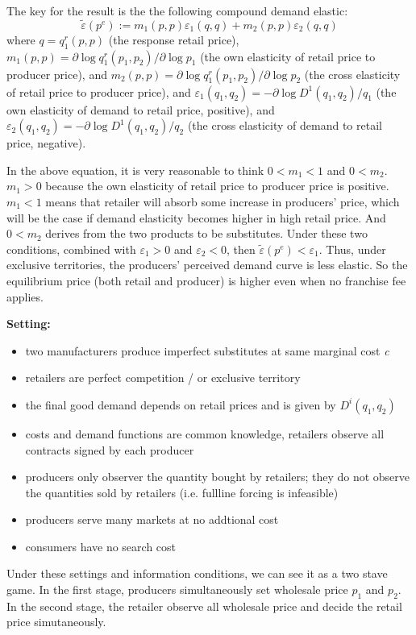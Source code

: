 \documentclass{book}
\theoremstyle{plain}
\theoremstyle{definition}
\begin{document}
The key for the result is the the following compound demand elastic:
\[\tilde\varepsilon(p^e):=m_1(p,p)\varepsilon_1(q,q)+m_2(p,p)\varepsilon_2(q,q) \]
where $q=q_1^r(p,p)$ (the response retail price),
$m_1(p,p)=\partial \log q_1^r(p_1,p_2)/\partial \log p_1$ (the own elasticity of retail price to producer price),
and  $m_2(p,p)=\partial \log q_1^r(p_1,p_2)/\partial \log p_2$ (the cross elasticity of retail price to producer price),
and $\varepsilon_1(q_1,q_2)=-\partial \log D^1(q_1,q_2)/q_1$ (the own elasticity of demand to retail price, positive),
and $\varepsilon_2(q_1,q_2)=-\partial \log D^1(q_1,q_2)/q_2$ (the cross elasticity of demand to retail price, negative).

In the above equation, it is very reasonable to think $0<m_1<1$ and $0<m_2$. $m_1>0$ because the own elasticity of retail price to producer price is positive. $m_1<1$ means that retailer will absorb some increase in producers' price, which will be the case if demand elasticity becomes higher in high retail price. And $0<m_2$ derives from the two products to be substitutes. Under these two conditions, combined with $\varepsilon_1>0$ and $\varepsilon_2<0$, then $\tilde\varepsilon(p^e)<\varepsilon_1$. Thus, under exclusive territories, the producers' perceived demand curve is less elastic. So the equilibrium price (both retail and producer) is higher even when no franchise fee applies.

\noindent
\textbf{Setting:}

\begin{itemize}
	\item two manufacturers produce imperfect substitutes at same marginal cost \textit{c}
	\item retailers are perfect competition / or exclusive territory
	\item the final good demand depends on retail prices and is given by $D^i(q_1,q_2)$
	\item costs and demand functions are common knowledge, retailers observe all contracts signed by each producer
	\item producers only observer the quantity bought by retailers; they do not observe the quantities sold by retailers (i.e. fullline forcing is infeasible)
	\item producers serve many markets at no addtional cost
	\item consumers have no search cost
\end{itemize}

Under these settings and information conditions, we can see it as a two stave game. In the first stage, producers simultaneously set wholesale price $p_1$ and $p_2$. In the second stage, the retailer observe all wholesale price and decide the retail price simutaneously.
\end{document}
